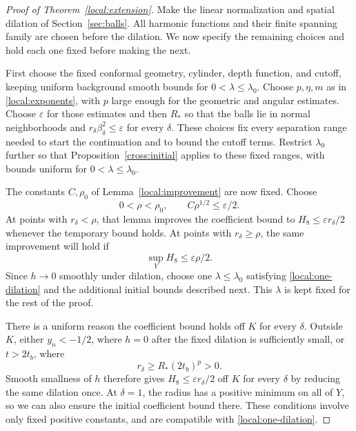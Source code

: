 \begin{proof}[Proof of Theorem~\ref{local:extension}]
Make the linear normalization and spatial dilation of
Section~\ref{sec:balls}.  All harmonic functions and their finite
spanning family are chosen before the dilation.  We now specify the
remaining choices and hold each one fixed before making the next.

First choose the fixed conformal geometry, cylinder, depth function,
and cutoff, keeping uniform background smooth bounds for
$0<\lambda\leq\lambda_0$.  Choose $p,\eta,m$ as in
\eqref{local:exponents}, with $p$ large enough for the geometric and
angular estimates.  Choose $\varepsilon$ for those estimates and then
$R_*$ so that the balls lie in normal neighborhoods and
$r_\delta\beta_\delta^2\leq\varepsilon$ for every $\delta$.
These choices fix every separation range needed to start the
continuation and to bound the cutoff terms.  Restrict $\lambda_0$
further so that Proposition~\ref{cross:initial} applies to these fixed
ranges, with bounds uniform for $0<\lambda\leq\lambda_0$.

The constants $C,\rho_0$ of Lemma~\ref{local:improvement} are now
fixed.  Choose
\begin{equation}\label{local:rho-choice}
 0<\rho<\rho_0,\qquad C\rho^{1/2}\leq\varepsilon/2.
\end{equation}
At points with $r_\delta<\rho$, that lemma improves the coefficient
bound to $H_8\leq\varepsilon r_\delta/2$ whenever the temporary bound
holds.  At points with $r_\delta\geq\rho$, the same improvement will
hold if
\begin{equation}\label{local:one-dilation}
 \sup_Y H_8\leq\varepsilon\rho/2.
\end{equation}
Since $h\to0$ smoothly under dilation, choose one
$\lambda\leq\lambda_0$ satisfying \eqref{local:one-dilation} and the
additional initial bounds described next.  This $\lambda$ is kept
fixed for the rest of the proof.

There is a uniform reason the coefficient bound holds off $K$ for
every $\delta$.  Outside $K$, either $y_n<-1/2$, where $h=0$ after
the fixed dilation is sufficiently small, or $t>2t_b$, where
\[
 r_\delta\geq R_*(2t_b)^p>0.
\]
Smooth smallness of $h$ therefore gives
$H_8\leq\varepsilon r_\delta/2$ off $K$ for every $\delta$ by
reducing the same dilation once.  At $\delta=1$, the radius has a
positive minimum on all of $Y$, so we can also ensure the initial
coefficient bound there.  These conditions involve only fixed
positive constants, and are compatible with
\eqref{local:one-dilation}.


\end{proof}
